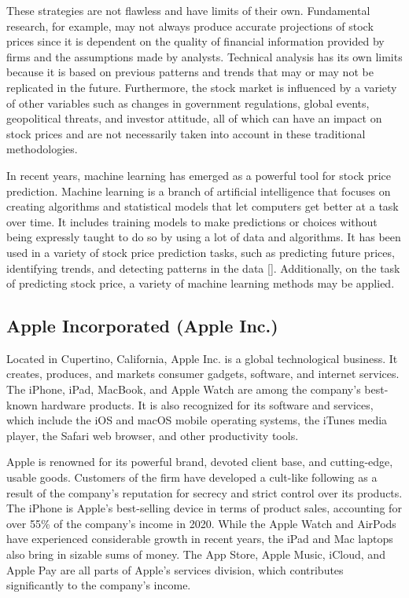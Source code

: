 \documentclass[a4paper]{article}
\begin{document}
These strategies are not flawless and have limits of their own. Fundamental research, for example, may not always produce accurate projections of stock prices since it is dependent on the quality of financial information provided by firms and the assumptions made by analysts. Technical analysis has its own limits because it is based on previous patterns and trends that may or may not be replicated in the future. Furthermore, the stock market is influenced by a variety of other variables such as changes in government regulations, global events, geopolitical threats, and investor attitude, all of which can have an impact on stock prices and are not necessarily taken into account in these traditional methodologies.

In recent years, machine learning has emerged as a powerful tool for stock price prediction. Machine learning is a branch of artificial intelligence that focuses on creating algorithms and statistical models that let computers get better at a task over time. It includes training models to make predictions or choices without being expressly taught to do so by using a lot of data and algorithms. It has been used in a variety of stock price prediction tasks, such as predicting future prices, identifying trends, and detecting patterns in the data [\cite{leung2014machine, patel2015predicting, ampomah2020evaluation}]. Additionally, on the task of predicting stock price, a variety of machine learning methods may be applied. 
\subsection{Apple Incorporated (Apple Inc.)}
Located in Cupertino, California, Apple Inc. is a global technological business. It creates, produces, and markets consumer gadgets, software, and internet services. The iPhone, iPad, MacBook, and Apple Watch are among the company's best-known hardware products. It is also recognized for its software and services, which include the iOS and macOS mobile operating systems, the iTunes media player, the Safari web browser, and other productivity tools.


Apple is renowned for its powerful brand, devoted client base, and cutting-edge, usable goods. Customers of the firm have developed a cult-like following as a result of the company's reputation for secrecy and strict control over its products. The iPhone is Apple's best-selling device in terms of product sales, accounting for over 55\% of the company's income in 2020. While the Apple Watch and AirPods have experienced considerable growth in recent years, the iPad and Mac laptops also bring in sizable sums of money. The App Store, Apple Music, iCloud, and Apple Pay are all parts of Apple's services division, which contributes significantly to the company's income.
\end{document}
